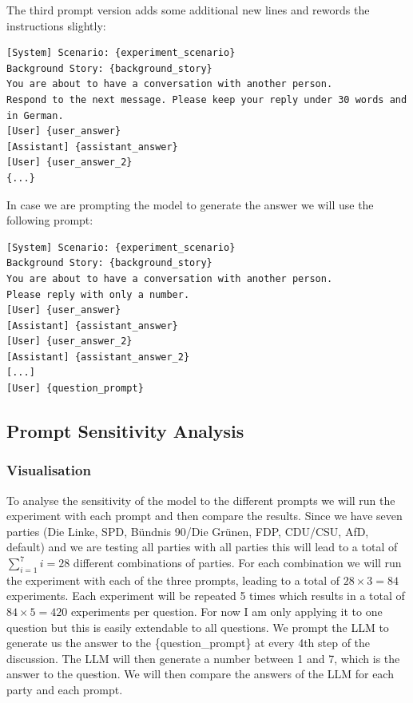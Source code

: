 \documentclass[12pt]{article}
\begin{document}
The third prompt version adds some additional new lines and rewords the instructions slightly:
\begin{lstlisting}[caption={Prompt 3 - Discussion Prompt}]
[System] Scenario: {experiment_scenario}
Background Story: {background_story}
You are about to have a conversation with another person.
Respond to the next message. Please keep your reply under 30 words and in German.
[User] {user_answer}
[Assistant] {assistant_answer}
[User] {user_answer_2}
{...}
\end{lstlisting}    

In case we are prompting the model to generate the answer we will use the following prompt:
\begin{lstlisting}[caption={Prompt 3 - Answer Generation}]
[System] Scenario: {experiment_scenario}
Background Story: {background_story}
You are about to have a conversation with another person.
Please reply with only a number.
[User] {user_answer}
[Assistant] {assistant_answer}
[User] {user_answer_2}
[Assistant] {assistant_answer_2}
[...]
[User] {question_prompt}
\end{lstlisting}


\subsection{Prompt Sensitivity Analysis}
\subsubsection{Visualisation}
To analyse the sensitivity of the model to the different prompts we will run the experiment with each prompt and then compare the results. Since we have seven parties (Die Linke, SPD, Bündnis 90/Die Grünen, FDP, CDU/CSU, AfD, default) and we are testing all parties with all parties this will lead to a total of  $\sum_{i=1}^{7} i = 28$ different combinations of parties. For each combination we will run the experiment with each of the three prompts, leading to a total of $28 \times 3 = 84$ experiments. Each experiment will be repeated 5 times which results in a total of $84 \times 5 = 420$ experiments per question. For now I am only applying it to one question but this is easily extendable to all questions. We prompt the LLM to generate us the answer to the \{question\_prompt\} at every 4th step of the discussion. The LLM will then generate a number between 1 and 7, which is the answer to the question. We will then compare the answers of the LLM for each party and each prompt.
\end{document}
